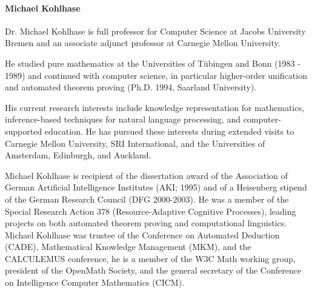 \paragraph{Michael Kohlhase}

%

%


Dr. Michael Kohlhase is full professor for Computer Science at Jacobs University Bremen
and an associate adjunct professor at Carnegie Mellon University.

He studied pure mathematics at the Universities of T\"ubingen and Bonn (1983 - 1989) and
continued with computer science, in particular higher-order unification and automated
theorem proving (Ph.D. 1994, Saarland University). 

His current research interests include knowledge representation for mathematics,
inference-based techniques for natural language processing, and computer-supported
education. He has pursued these interests during extended visits to Carnegie Mellon
University, SRI International, and the Universities of Amsterdam, Edinburgh, and Auckland.

Michael Kohlhase is recipient of the dissertation award of the Association of German
Artificial Intelligence Institutes (AKI; 1995) and of a Heisenberg stipend of the German
Research Council (DFG 2000-2003). He was a member of the Special Research Action 378
(Resource-Adaptive Cognitive Processes), leading projects on both automated theorem
proving and computational linguistics. Michael Kohlhase was trustee of the Conference on
Automated Deduction (CADE), Mathematical Knowledge Management (MKM), and the CALCULEMUS
conference, he is a member of the W3C Math working group, president of the OpenMath
Society, and the general secretary of the Conference on Intelligence Computer Mathematics
(CICM).



 


